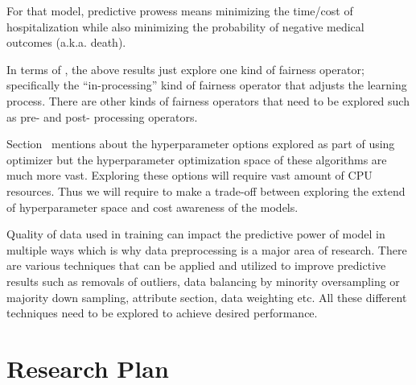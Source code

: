 For that model, predictive prowess means minimizing the time/cost of hospitalization
while also minimizing the probability of negative medical outcomes (a.k.a. death).  
\item
In terms of , the above results just explore one kind of fairness operator;
specifically the  ``in-processing'' kind of fairness operator that adjusts the learning process.
There are other kinds of fairness operators that need to be explored such as pre- and post- processing operators. 
\item
Section~ mentions about the hyperparameter options explored as part of using optimizer but the hyperparameter optimization space of these algorithms are much more vast. Exploring these options will require vast amount of CPU resources. Thus we will require to make a trade-off between exploring the extend of hyperparameter space and cost awareness of the models.
\item
Quality of data used in training can impact the predictive power of model in multiple ways which is why data preprocessing is a major area of research. There are various techniques that can be applied and utilized to improve predictive results such as removals of outliers, data balancing by minority oversampling or majority down sampling, attribute section, data weighting etc. All these different techniques need to be explored to achieve desired performance. 

\ei

\newcommand{\head}[1]{\noindent{\bf \underline{#1}}:}

\section{Research Plan}\label{tion:plan}



